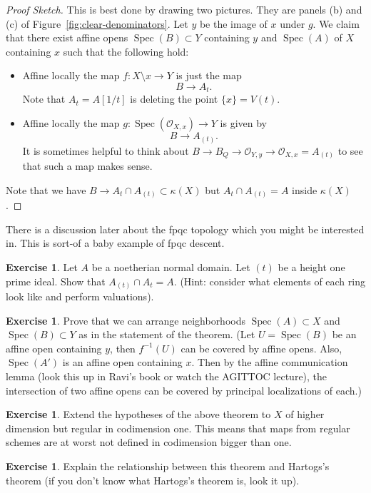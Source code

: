 \documentclass[12pt]{article}
\numberwithin{equation}{section}
\theoremstyle{definition}
\newtheorem{exercise}[theorem]{Exercise}
\theoremstyle{remark}
\newcommand{\Ocal}{\mathcal{O}}
\newcommand{\Spec}{\operatorname{Spec}}
\begin{document}
\begin{proof}[Proof Sketch]
	This is best done by drawing two pictures.
	They are panels (b) and (c) of Figure~\ref{fig:clear-denominators}.
	Let $y$ be the image of $x$ under $g$.
	We claim that there exist affine opens $\Spec(B) \subset Y$ containing $y$ and $\Spec(A)$ of $X$ containing $x$ such that the following hold:
	\begin{itemize}
		\item Affine locally the map $f: X\setminus x \to Y$ is just the map
		$$B \to A_t.$$
		Note that $A_t = A[1/t]$ is deleting the point $\lbrace x\rbrace=V(t)$.
		\item Affine locally the map $g: \Spec(\Ocal_{X,x}) \to Y$ is given by 
		$$ B \to A_{(t)}.$$
		It is sometimes helpful to think about $B \to B_Q \to \Ocal_{Y,y} \to \Ocal_{X,x} = A_{(t)}$ to see that such a map makes sense.
	\end{itemize}
	Note that we have $B \to A_t \cap A_{(t)} \subset \kappa(X)$ but $A_t \cap A_{(t)} = A$ inside $\kappa(X)$.
\end{proof}

There is a discussion later about the fpqc topology which you might be interested in. 
This is sort-of a baby example of fpqc descent.

\begin{exercise}
	Let $A$ be a noetherian normal domain. 
	Let $(t)$ be a height one prime ideal. 
	Show that $A_{(t)} \cap A_t = A$.  (Hint: consider what elements of each ring look like and perform valuations).
\end{exercise}

\begin{exercise}
	Prove that we can arrange neighborhoods $\Spec(A)\subset X$ and $\Spec(B)\subset Y$ as in the statement of the theorem. 
	(Let $U=\Spec(B)$ be an affine open containing $y$, then $f^{-1}(U)$ can be covered by affine opens. Also, $\Spec(A')$ is an affine open containing $x$. 
	Then by the affine communication lemma (look this up in Ravi's book or watch the AGITTOC lecture), the intersection of two affine opens can be covered by principal localizations of each.)
\end{exercise}

\begin{exercise}
	Extend the hypotheses of the above theorem to $X$ of higher dimension but regular in codimension one. 
	This means that maps from regular schemes are at worst not defined in codimension bigger than one.
\end{exercise}

\begin{exercise}
	Explain the relationship between this theorem and Hartogs's theorem (if you don't know what Hartogs's theorem is, look it up).
\end{exercise}
\end{document}

